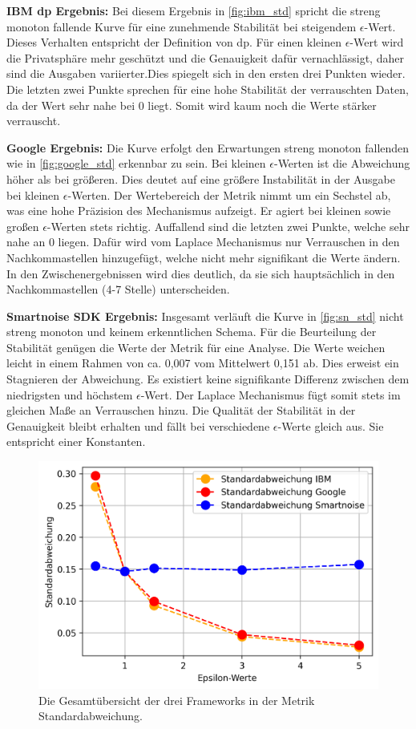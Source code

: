 \textbf{IBM \gls{dp} Ergebnis:}
Bei diesem Ergebnis in \cref{fig:ibm_std} spricht die streng monoton fallende Kurve für eine zunehmende Stabilität bei steigendem $\epsilon$-Wert. Dieses Verhalten entspricht der Definition von \gls{dp}. Für einen kleinen $\epsilon$-Wert wird die Privatsphäre mehr geschützt und die Genauigkeit dafür vernachlässigt, daher sind die Ausgaben variierter.Dies spiegelt sich in den ersten drei Punkten wieder. Die letzten zwei Punkte sprechen für eine hohe Stabilität der verrauschten Daten, da der Wert sehr nahe bei $0$ liegt. Somit wird kaum noch die Werte stärker verrauscht.

\textbf{Google Ergebnis:}
Die Kurve erfolgt den Erwartungen streng monoton fallenden wie in \cref{fig:google_std} erkennbar zu sein. Bei kleinen $\epsilon$-Werten ist die Abweichung höher als bei größeren. Dies deutet auf eine größere Instabilität in der Ausgabe bei kleinen $\epsilon$-Werten. Der Wertebereich der Metrik nimmt um ein Sechstel ab, was eine hohe Präzision des Mechanismus aufzeigt. Er agiert bei kleinen sowie großen $\epsilon$-Werten stets richtig. Auffallend sind die letzten zwei Punkte, welche sehr nahe an $0$ liegen. Dafür wird vom Laplace Mechanismus nur Verrauschen in den Nachkommastellen hinzugefügt, welche nicht mehr signifikant die Werte ändern. In den Zwischenergebnissen wird dies deutlich, da sie sich hauptsächlich in den Nachkommastellen (4-7 Stelle) unterscheiden.

\textbf{Smartnoise SDK Ergebnis:}
Insgesamt verläuft die Kurve in \cref{fig:sn_std} nicht streng monoton und keinem erkenntlichen Schema. Für die Beurteilung der Stabilität genügen die Werte der Metrik für eine Analyse. Die Werte weichen leicht in einem Rahmen von ca. 0,007 vom Mittelwert 0,151 ab. Dies erweist ein Stagnieren der Abweichung. Es existiert keine signifikante Differenz zwischen dem niedrigsten und höchstem $\epsilon$-Wert. Der Laplace Mechanismus fügt somit stets im gleichen Maße an Verrauschen hinzu. Die Qualität der Stabilität in der Genauigkeit bleibt erhalten und fällt bei verschiedene $\epsilon$-Werte gleich aus. Sie entspricht einer Konstanten.
\begin{figure}[htbp]
	\centering
	\includegraphics[scale=0.6]{./images/together_std.png}
	\caption{Die Gesamtübersicht der drei Frameworks in der Metrik Standardabweichung.}
	\label{fig:together_std}
\end{figure}


